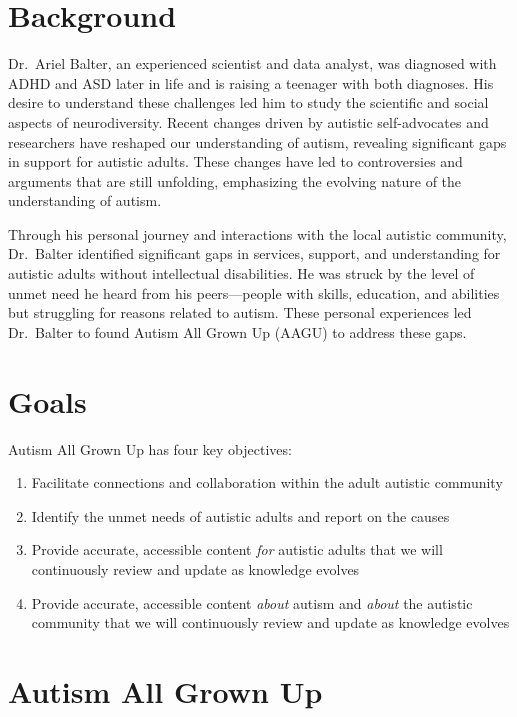 \documentclass[
  letterpaper,
  DIV=11,
  numbers=noendperiod]{scrreprt}
\providecommand{\tightlist}{%
  \setlength{\itemsep}{0pt}\setlength{\parskip}{0pt}}\usepackage{longtable,booktabs,array}
\begin{document}
\section{Background}\label{sec-ex_sum_background}

Dr.~Ariel Balter, an experienced scientist and data analyst, was
diagnosed with ADHD and ASD later in life and is raising a teenager with
both diagnoses. His desire to understand these challenges led him to
study the scientific and social aspects of neurodiversity. Recent
changes driven by autistic self-advocates and researchers have reshaped
our understanding of autism, revealing significant gaps in support for
autistic adults. These changes have led to controversies and arguments
that are still unfolding, emphasizing the evolving nature of the
understanding of autism.

Through his personal journey and interactions with the local autistic
community, Dr.~Balter identified significant gaps in services, support,
and understanding for autistic adults without intellectual disabilities.
He was struck by the level of unmet need he heard from his
peers---people with skills, education, and abilities but struggling for
reasons related to autism. These personal experiences led Dr.~Balter to
found Autism All Grown Up (AAGU) to address these gaps.

\section{Goals}\label{sec-ex_sum_goals}

Autism All Grown Up has four key objectives:

\begin{enumerate}
\def\labelenumi{\arabic{enumi}.}
\tightlist
\item
  Facilitate connections and collaboration within the adult autistic
  community
\item
  Identify the unmet needs of autistic adults and report on the causes
\item
  Provide accurate, accessible content \emph{for} autistic adults that
  we will continuously review and update as knowledge evolves
\item
  Provide accurate, accessible content \emph{about} autism and
  \emph{about} the autistic community that we will continuously review
  and update as knowledge evolves
\end{enumerate}

\section{Autism All Grown Up}\label{sec-ex_name}
\end{document}
